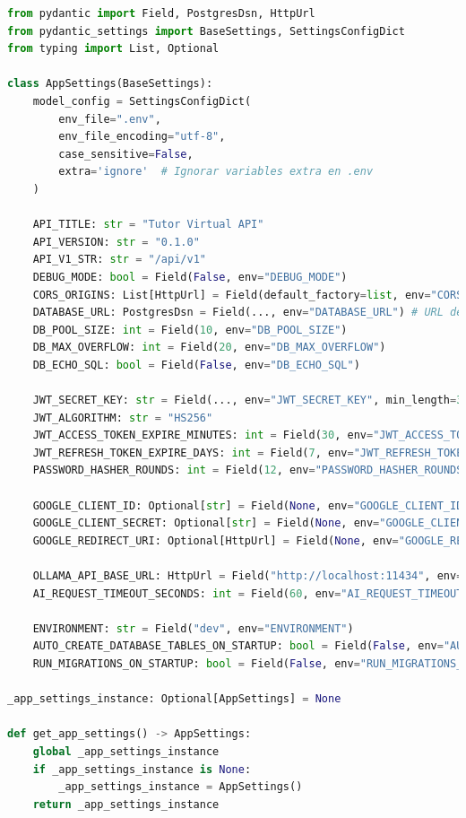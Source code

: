 \clearpage
\begin{lstlisting}[language=python,
                   caption={Extracto del objeto de configuración global (\texttt{src/core/config.py}) utilizando Pydantic Settings.},
                   label={lst:desarrollo_settings}, % Label actualizada
                   basicstyle=\fontsize{8}{9.5}\ttfamily]
from pydantic import Field, PostgresDsn, HttpUrl
from pydantic_settings import BaseSettings, SettingsConfigDict
from typing import List, Optional

class AppSettings(BaseSettings):
    model_config = SettingsConfigDict(
        env_file=".env",
        env_file_encoding="utf-8",
        case_sensitive=False,
        extra='ignore'  # Ignorar variables extra en .env
    )

    API_TITLE: str = "Tutor Virtual API"
    API_VERSION: str = "0.1.0"
    API_V1_STR: str = "/api/v1"
    DEBUG_MODE: bool = Field(False, env="DEBUG_MODE")
    CORS_ORIGINS: List[HttpUrl] = Field(default_factory=list, env="CORS_ORIGINS")
    DATABASE_URL: PostgresDsn = Field(..., env="DATABASE_URL") # URL de conexión a PostgreSQL (obligatoria)
    DB_POOL_SIZE: int = Field(10, env="DB_POOL_SIZE")
    DB_MAX_OVERFLOW: int = Field(20, env="DB_MAX_OVERFLOW")
    DB_ECHO_SQL: bool = Field(False, env="DB_ECHO_SQL")
    
    JWT_SECRET_KEY: str = Field(..., env="JWT_SECRET_KEY", min_length=32)
    JWT_ALGORITHM: str = "HS256"
    JWT_ACCESS_TOKEN_EXPIRE_MINUTES: int = Field(30, env="JWT_ACCESS_TOKEN_EXPIRE_MINUTES")
    JWT_REFRESH_TOKEN_EXPIRE_DAYS: int = Field(7, env="JWT_REFRESH_TOKEN_EXPIRE_DAYS")
    PASSWORD_HASHER_ROUNDS: int = Field(12, env="PASSWORD_HASHER_ROUNDS")

    GOOGLE_CLIENT_ID: Optional[str] = Field(None, env="GOOGLE_CLIENT_ID")
    GOOGLE_CLIENT_SECRET: Optional[str] = Field(None, env="GOOGLE_CLIENT_SECRET")
    GOOGLE_REDIRECT_URI: Optional[HttpUrl] = Field(None, env="GOOGLE_REDIRECT_URI")

    OLLAMA_API_BASE_URL: HttpUrl = Field("http://localhost:11434", env="OLLAMA_API_BASE_URL")
    AI_REQUEST_TIMEOUT_SECONDS: int = Field(60, env="AI_REQUEST_TIMEOUT_SECONDS") # Timeout para peticiones a la IA

    ENVIRONMENT: str = Field("dev", env="ENVIRONMENT")
    AUTO_CREATE_DATABASE_TABLES_ON_STARTUP: bool = Field(False, env="AUTO_CREATE_DATABASE_TABLES_ON_STARTUP")
    RUN_MIGRATIONS_ON_STARTUP: bool = Field(False, env="RUN_MIGRATIONS_ON_STARTUP")

_app_settings_instance: Optional[AppSettings] = None

def get_app_settings() -> AppSettings:
    global _app_settings_instance
    if _app_settings_instance is None:
        _app_settings_instance = AppSettings()
    return _app_settings_instance
\end{lstlisting}

